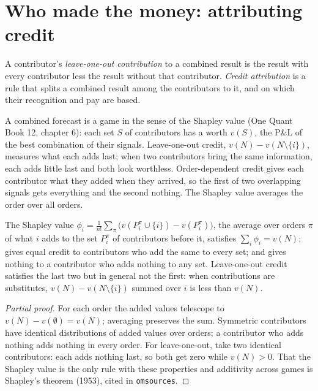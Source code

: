 \section{Who made the money: attributing credit}

\begin{definition}\label{def:fm:managing-researchers-traders-and-engineers:credit}
A contributor's \emph{leave-one-out contribution} to a combined result is the result with every contributor
less the result without that contributor. \emph{Credit attribution} is a rule that splits a combined result among
the contributors to it, and on which their recognition and pay are based.
\end{definition}

A combined forecast is a game in the sense of the Shapley value (One Quant Book 12, chapter 6): each set $S$ of contributors has a worth $v(S)$,
the P\&L of the best combination of their signals. Leave-one-out credit, $v(N)-v(N\setminus\{i\})$, measures what each adds last; when two
contributors bring the same information, each adds little last and both look worthless. Order-dependent credit gives each contributor what they
added when they arrived, so the first of two overlapping signals gets everything and the second nothing. The Shapley value averages the order
over all orders.

\begin{proposition}\label{prop:fm:managing-researchers-traders-and-engineers:shapley}
The Shapley value
$\phi_i=\frac{1}{n!}\sum_{\pi}\bigl(v(P_i^\pi\cup\{i\})-v(P_i^\pi)\bigr)$, the average over orders $\pi$ of what $i$ adds to the set $P_i^\pi$ of
contributors before it, satisfies $\sum_i\phi_i=v(N)$; gives equal credit to contributors who add the same to every set; and gives nothing to a
contributor who adds nothing to any set. Leave-one-out credit satisfies the last two but in general not the first: when contributions are
substitutes, $v(N)-v(N\setminus\{i\})$ summed over $i$ is less than $v(N)$.
\end{proposition}

\begin{proof}[Partial proof]
For each order the added values telescope to $v(N)-v(\emptyset)=v(N)$; averaging preserves the sum. Symmetric contributors have identical
distributions of added values over orders; a contributor who adds nothing adds nothing in every order. For leave-one-out, take two identical
contributors: each adds nothing last, so both get zero while $v(N)>0$. That the Shapley value is the only rule with these properties and
additivity across games is Shapley's theorem (1953), cited in \texttt{omsources}.
\end{proof}


